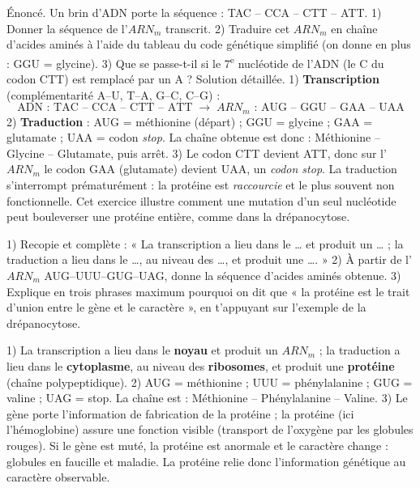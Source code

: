 \documentclass[11pt]{article}
\begin{document}
\begin{exoresolu}
Énoncé. Un brin d'ADN porte la séquence : TAC -- CCA -- CTT -- ATT. 1) Donner la séquence de l'$ARN_m$ transcrit. 2) Traduire cet $ARN_m$ en chaîne d'acides aminés à l'aide du tableau du code génétique simplifié (on donne en plus : GGU = glycine). 3) Que se passe-t-il si le 7\textsuperscript{e} nucléotide de l'ADN (le C du codon CTT) est remplacé par un A ?
\tcblower
Solution détaillée.
1) \textbf{Transcription} (complémentarité A--U, T--A, G--C, C--G) :
\[ \text{ADN : TAC -- CCA -- CTT -- ATT} \;\longrightarrow\; \text{$ARN_m$ : AUG -- GGU -- GAA -- UAA} \]
2) \textbf{Traduction} : AUG = méthionine (départ) ; GGU = glycine ; GAA = glutamate ; UAA = codon \emph{stop}. La chaîne obtenue est donc : Méthionine -- Glycine -- Glutamate, puis arrêt.
3) Le codon CTT devient ATT, donc sur l'$ARN_m$ le codon GAA (glutamate) devient UAA, un \emph{codon stop}. La traduction s'interrompt prématurément : la protéine est \emph{raccourcie} et le plus souvent non fonctionnelle. Cet exercice illustre comment une mutation d'un seul nucléotide peut bouleverser une protéine entière, comme dans la drépanocytose.
\end{exoresolu}

\begin{exercice}
1) Recopie et complète : « La transcription a lieu dans le \ldots{} et produit un \ldots{} ; la traduction a lieu dans le \ldots{}, au niveau des \ldots{}, et produit une \ldots{}. »
2) À partir de l'$ARN_m$ AUG--UUU--GUG--UAG, donne la séquence d'acides aminés obtenue.
3) Explique en trois phrases maximum pourquoi on dit que « la protéine est le trait d'union entre le gène et le caractère », en t'appuyant sur l'exemple de la drépanocytose.
\end{exercice}

\begin{corrige}
1) La transcription a lieu dans le \textbf{noyau} et produit un \textbf{$ARN_m$} ; la traduction a lieu dans le \textbf{cytoplasme}, au niveau des \textbf{ribosomes}, et produit une \textbf{protéine} (chaîne polypeptidique).
2) AUG = méthionine ; UUU = phénylalanine ; GUG = valine ; UAG = stop. La chaîne est : Méthionine -- Phénylalanine -- Valine.
3) Le gène porte l'information de fabrication de la protéine ; la protéine (ici l'hémoglobine) assure une fonction visible (transport de l'oxygène par les globules rouges). Si le gène est muté, la protéine est anormale et le caractère change : globules en faucille et maladie. La protéine relie donc l'information génétique au caractère observable.
\end{corrige}
\end{document}
